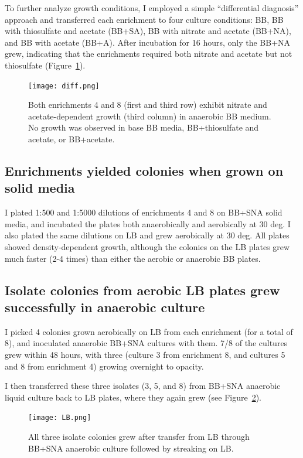 \documentclass{article}
\begin{document}
To further analyze growth conditions, I employed a simple
``differential diagnosis'' approach and transferred each enrichment to
four culture conditions: BB, BB with thiosulfate and acetate (BB+SA),
BB with nitrate and acetate (BB+NA), and BB with acetate (BB+A).
After incubation for 16 hours, only the BB+NA grew, indicating that
the enrichments required both nitrate and acetate but not
thiosulfate (Figure~\ref{fig:diff}).

\begin{figure}[!ht]
  \centerline{\texttt{[image: diff.png]}}
  \caption{Both enrichments 4 and 8 (first and third row) exhibit
    nitrate and acetate-dependent growth (third column) in anaerobic BB medium. No growth was observed in base BB media, BB+thiosulfate and acetate, or BB+acetate.}
  \label{fig:diff}
\end{figure}


\subsection*{Enrichments yielded colonies when grown on solid media}

I plated 1:500 and 1:5000 dilutions of enrichments 4 and 8 on BB+SNA
solid media, and incubated the plates both anaerobically and
aerobically at 30 deg.  I also plated the same dilutions on LB and
grew aerobically at 30 deg.  All plates showed density-dependent growth,
although the colonies on the LB plates grew much faster (2-4 times)
than either the aerobic or anaerobic BB plates.

\subsection*{Isolate colonies from aerobic LB plates grew successfully
  in anaerobic culture}

I picked 4 colonies grown aerobically on LB from each enrichment (for
a total of 8), and inoculated anaerobic BB+SNA cultures with them.
7/8 of the cultures grew within 48 hours, with three (culture 3 from
enrichment 8, and cultures 5 and 8 from enrichment 4) growing
overnight to opacity.

I then transferred these three isolates (3, 5, and 8) from BB+SNA
anaerobic liquid culture back to LB plates, where they again grew
(see Figure~\ref{fig:LB}).

\begin{figure}[!ht]
  \centerline{\texttt{[image: LB.png]}}
  \caption{All three isolate colonies grew after transfer from LB
    through BB+SNA anaerobic culture followed by streaking on LB.}
  \label{fig:LB}
\end{figure}
\end{document}
